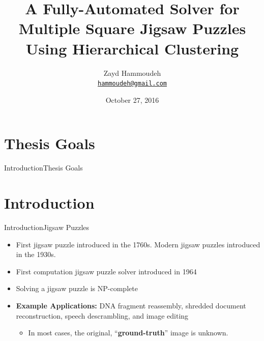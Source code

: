 \documentclass[handout,10pt]{beamer}  %
\title[A Fully-Automated Solver for Multiple Square Jigsaw Puzzles Using Hierarchical Clustering]%
{\textbf{A Fully-Automated Solver for Multiple Square Jigsaw Puzzles Using Hierarchical Clustering}}
\subtitle{}  %
\date{October 27, 2016}
\author[Zayd Hammoudeh] %
{
    Zayd Hammoudeh\\
    \href{mailto:hammoudeh@gmail.com}{{\tt hammoudeh@gmail.com}}
}
\institute[
    Dept.\ of Computer Science\\
    San Jos\'{e} State University\\
] %
{%
    Department of Computer Science\\
    San Jos\'{e} State University\\
  
}
\begin{document}
{
\begin{frame}{}{} %
	\titlepage
\end{frame}}






\section{Thesis Goals}
\begin{frame}{Introduction}{Thesis Goals}
\end{frame}



\section{Introduction}
\begin{frame}{Introduction}{Jigsaw Puzzles}
  \begin{itemize}
    \item First jigsaw puzzle introduced in the 1760s.  Modern jigsaw puzzles introduced in the 1930s.
    \vfill
    \item First computation jigsaw puzzle solver introduced in 1964
    \vfill
    \item Solving a jigsaw puzzle is NP-complete~\cite{altman1990, demaine2007}
    \vfill
    \item<2-> \textbf{Example Applications:} DNA fragment reassembly, shredded document reconstruction, speech descrambling, and image editing
    \begin{itemize}
        \item<3-> In most cases, the original, ``{\color{spartanBlue}\textbf{ground-truth}}'' image is unknown.
    \end{itemize}
  \end{itemize}
\end{frame}
\end{document}

